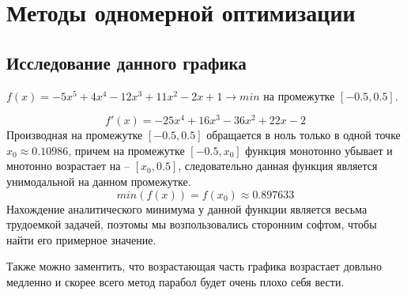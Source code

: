 \chapter{Методы одномерной оптимизации}
\section{Исследование данного графика}

$f(x) = -5x^5 + 4x^4 - 12x^3 + 11x^2 - 2x + 1 \rightarrow min$ на промежутке $[-0.5, 0.5]$.

$$f'(x) = -25x^4 + 16x^3 - 36x^2 + 22x - 2$$
Производная на промежутке $[-0.5, 0.5]$ обращается в ноль только в одной точке $x_0 \approx 0.10986$, причем на промежутке $[-0.5, x_0]$ функция монотонно убывает и мнотонно возрастает на -- $[x_0, 0.5]$, следовательно данная функция является унимодальной на данном промежутке.
$$min(f(x)) = f(x_0) \approx 0.897633$$
Нахождение аналитического минимума у данной функции является весьма трудоемкой задачей, поэтомы мы возпользовались сторонним софтом, чтобы найти его примерное значение.


Также можно заментить, что возрастающая часть графика возрастает довльно медленно и скорее всего 
метод парабол будет очень плохо себя вести.


